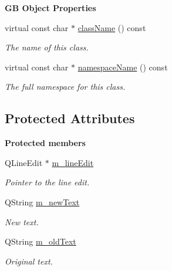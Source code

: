 \begin{Indent}\textbf{ GB Object Properties}\par
\begin{DoxyCompactItemize}
\item 
virtual const char $\ast$ \mbox{\hyperlink{classrev_1_1_edit_line_edit_command_a08cedca4363770f54736cec4f35db942}{class\+Name}} () const
\begin{DoxyCompactList}\small\item\em The name of this class. \end{DoxyCompactList}\item 
virtual const char $\ast$ \mbox{\hyperlink{classrev_1_1_edit_line_edit_command_a5289fd61a70c28475698a5f4cf30753b}{namespace\+Name}} () const
\begin{DoxyCompactList}\small\item\em The full namespace for this class. \end{DoxyCompactList}\end{DoxyCompactItemize}
\end{Indent}
\subsection*{Protected Attributes}
\begin{Indent}\textbf{ Protected members}\par
\begin{DoxyCompactItemize}
\item 
\mbox{\label{classrev_1_1_edit_line_edit_command_ad35fa803da5ffe878131bef36921bfab}} 
Q\+Line\+Edit $\ast$ \mbox{\hyperlink{classrev_1_1_edit_line_edit_command_ad35fa803da5ffe878131bef36921bfab}{m\+\_\+line\+Edit}}
\begin{DoxyCompactList}\small\item\em Pointer to the line edit. \end{DoxyCompactList}\item 
\mbox{\label{classrev_1_1_edit_line_edit_command_aa2b3bc3bbe8a875828a3e490dbbfb85c}} 
Q\+String \mbox{\hyperlink{classrev_1_1_edit_line_edit_command_aa2b3bc3bbe8a875828a3e490dbbfb85c}{m\+\_\+new\+Text}}
\begin{DoxyCompactList}\small\item\em New text. \end{DoxyCompactList}\item 
\mbox{\label{classrev_1_1_edit_line_edit_command_aa95f731f9d49c34008d6a13ab5826ebb}} 
Q\+String \mbox{\hyperlink{classrev_1_1_edit_line_edit_command_aa95f731f9d49c34008d6a13ab5826ebb}{m\+\_\+old\+Text}}
\begin{DoxyCompactList}\small\item\em Original text. \end{DoxyCompactList}\end{DoxyCompactItemize}
\end{Indent}

